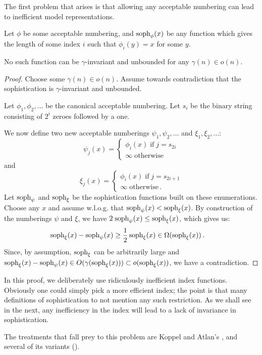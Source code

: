 \documentclass{style/llncs}
\newcommand{\tn}[1]{\textnormal{#1}}
\newcommand{\s}{\tn{soph}}
\newcommand{\num}[1]{#1_1, #1_2, \ldots}
\newcommand{\p}{\,\text{.}}
\begin{document}
The first problem that arises is that allowing any acceptable numbering can lead to inefficient model representations.

\begin{lemma}
Let $\phi$ be some acceptable numbering, and $\s_\phi(x)$ be any function which gives the length of some index $i$ such that $\phi_i(y) = x$ for some $y$.

No such function can be $\gamma$-invariant and unbounded for any $\gamma(n) \in o(n)$.
\end{lemma}
\begin{proof}
Choose some $\gamma(n) \in o(n)$. Assume towards contradiction that the sophistication is $\gamma$-invariant and unbounded.

Let $\num{\phi}$ be the canonical acceptable numbering. Let $s_i$ be the binary string consisting of $2^{i}$ zeroes followed by a one.

We now define two new acceptable numberings $\num{\psi}$ and $\num{\xi}$:
\[
\psi_j(x) = 
\begin{cases}
	\phi_i(x) \;\text{if}\; j = s_{2i}\\
	\infty\;\text{otherwise}
\end{cases}
\]
and 
\[
\xi_j(x) = 
\begin{cases}
	\phi_i(x) \;\text{if}\; j = s_{2i+1} \\
	\infty \;\text{otherwise}\p
\end{cases}
\]
Let $\s_\psi$ and $\s_\xi$ be the sophistication functions built on these enumerations. Choose any $x$ and assume w.l.o.g. that $\s_\psi(x) < \s_\xi(x)$. By construction of the numberings $\psi$ and $\xi$, we have $2\;\s_\psi(x)  \leq \s_\xi(x)$, which gives us:
\begin{align*}
	\s_\xi(x) - \s_\psi(x) &\geq \frac{1}{2}\, \s_\xi(x)  \in \Omega(\s_\xi(x))\p 
\end{align*}
Since, by assumption, $\s_\xi$ can be arbitrarily large and $\s_\xi(x) - \s_\psi(x) \in O(\gamma(\s_\xi(x))) \subset o(\s_\xi(x))$, we have a contradiction.
\end{proof}

In this proof, we deliberately use ridiculously inefficient index functions. Obviously one could simply pick a more efficient index; the point is that many definitions of sophistication to not mention any such restriction. As we shall see in the next, any inefficiency in the index will lead to a lack of invariance in sophistication.

The treatments that fall prey to this problem are Koppel and Atlan's \cite{koppelSoph1988,koppel1991almost},  and several of its variants (\cite{antunes2009sophistication,antunes2013sophistication}). 
\end{document}
